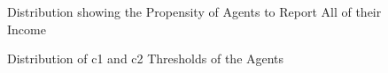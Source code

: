 \documentclass{article}
\begin{document}
	\begin{figure}[ht]
		\caption{Distribution showing the Propensity of Agents to Report All of their Income}
	\end{figure}
	
	\begin{figure}[ht]
		\caption{Distribution of c1 and c2 Thresholds of the Agents}
	\end{figure}
	
	
	
\end{document}

